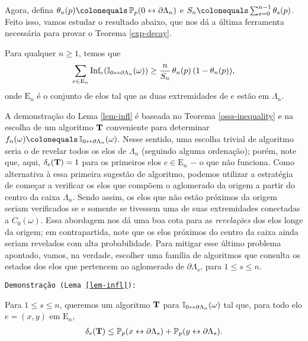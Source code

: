 Agora, defina $\theta_n(p) \colonequals \PX_p(0 \leftrightarrow \partial\Lambda_n)$ e $S_n \colonequals \sum_{s = 0}^{n-1} \theta_s(p)$. Feito isso, vamos estudar o resultado abaixo, que nos dá a última ferramenta necessária para provar o Teorema \ref{exp-decay}.

\begin{mylem} \label{lem-infl}
	Para qualquer $n \geq 1$, temos que
	\begin{align*}
		\sum_{e \in \text{E}_n} \text{Inf}_e(\operatorname{\mathbb{I}}_{0 \leftrightarrow \partial\Lambda_n}(\omega)) \geq \frac{n}{S_n} \, \theta_n(p)\, (1 - \theta_n(p)),
	\end{align*}
	onde $\text{E}_n$ é o conjunto de elos tal que as duas extremidades de $e$ estão em $\Lambda_n$.
\end{mylem}

\par A demonstração do Lema \ref{lem-infl} é baseada no Teorema \ref{osss-inequality} e na escolha de um algoritmo $\text{\textbf{T}}$ conveniente para determinar $f_n(\omega) \colonequals \IX_{0 \leftrightarrow \partial\Lambda_n}(\omega)$. Nesse sentido, uma escolha trivial de algoritmo seria o de revelar todos os elos de $\Lambda_n$ (seguindo alguma ordenação); porém, note que, aqui, $\delta_e(\text{\textbf{T}}) = 1$ para os primeiros elos $e \in \text{E}_n$ $-$ o que não funciona. Como alternativa à essa primeira sugestão de algoritmo, podemos utilizar a estratégia de começar a verificar os elos que compõem o aglomerado da origem a partir do centro da caixa $\Lambda_n$. Sendo assim, os elos que não estão próximos da origem seriam verificados se e somente se tivessem uma de suas extremidades conectadas a $C_0(\omega)$. Essa abordagem nos dá uma boa cota para as \textit{revelações} dos elos longe da origem; em contrapartida, note que os elos próximos do centro da caixa ainda seriam revelados com alta probabilidade. Para mitigar esse último problema apontado, vamos, na verdade, escolher uma família de algoritmos que consulta os estados dos elos que pertencem ao aglomerado de $\partial\Lambda_s$, para $1 \leq s \leq n$.

\par \texttt{Demonstração (Lema \ref{lem-infl}):}

\par Para $1 \leq s \leq n$, queremos um algoritmo $\text{\textbf{T}}$ para $\operatorname{\mathbb{I}}_{0 \leftrightarrow \partial\Lambda_n}(\omega)$ tal que, para todo elo $e = (x, y)$ em $\text{E}_n$,
\begin{align} \label{cota-revelacao}
	\delta_e(\text{\textbf{T}}) \leq \operatorname{\mathbb{P}}_p(x \leftrightarrow \partial\Lambda_s) + \operatorname{\mathbb{P}}_p(y \leftrightarrow \partial\Lambda_s).
\end{align}

